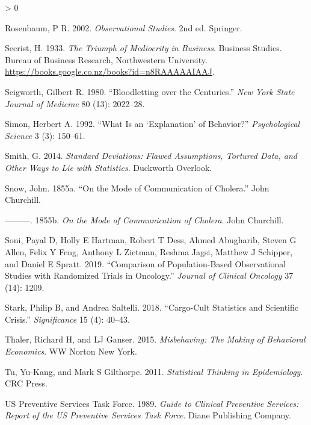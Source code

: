 \documentclass[
  10pt,
  b5paper]{book}
\newlength{\cslhangindent}
\newenvironment{CSLReferences}[2] %
 {%
  \setlength{\parindent}{0pt}
  \ifodd #1 \everypar{\setlength{\hangindent}{\cslhangindent}}\ignorespaces\fi
  \ifnum #2 > 0
  \setlength{\parskip}{#2\baselineskip}
  \fi
 }%
 {}
\begin{document}
\begin{CSLReferences}{1}{0}
\leavevmode\hypertarget{ref-RosBook}{}%
Rosenbaum, P R. 2002. \emph{Observational Studies}. 2nd ed. Springer.

\leavevmode\hypertarget{ref-secrist1933triumph}{}%
Secrist, H. 1933. \emph{The Triumph of Mediocrity in Business}. Business Studies. Bureau of Business Research, Northwestern University. \url{https://books.google.co.nz/books?id=n8RAAAAAIAAJ}.

\leavevmode\hypertarget{ref-seigworth1980bloodletting}{}%
Seigworth, Gilbert R. 1980. {``Bloodletting over the Centuries.''} \emph{New York State Journal of Medicine} 80 (13): 2022--28.

\leavevmode\hypertarget{ref-simon1992explanation}{}%
Simon, Herbert A. 1992. {``What Is an {`Explanation'} of Behavior?''} \emph{Psychological Science} 3 (3): 150--61.

\leavevmode\hypertarget{ref-smith-sd}{}%
Smith, G. 2014. \emph{Standard Deviations: Flawed Assumptions, Tortured Data, and Other Ways to Lie with Statistics}. Duckworth Overlook.

\leavevmode\hypertarget{ref-snow1849mode}{}%
Snow, John. 1855a. {``On the Mode of Communication of Cholera.''} John Churchill.

\leavevmode\hypertarget{ref-snow1855mode}{}%
---------. 1855b. \emph{On the Mode of Communication of Cholera}. John Churchill.

\leavevmode\hypertarget{ref-soni2019comparison}{}%
Soni, Payal D, Holly E Hartman, Robert T Dess, Ahmed Abugharib, Steven G Allen, Felix Y Feng, Anthony L Zietman, Reshma Jagsi, Matthew J Schipper, and Daniel E Spratt. 2019. {``Comparison of Population-Based Observational Studies with Randomized Trials in Oncology.''} \emph{Journal of Clinical Oncology} 37 (14): 1209.

\leavevmode\hypertarget{ref-stark2018cargo}{}%
Stark, Philip B, and Andrea Saltelli. 2018. {``Cargo-Cult Statistics and Scientific Crisis.''} \emph{Significance} 15 (4): 40--43.

\leavevmode\hypertarget{ref-thaler2015misbehaving}{}%
Thaler, Richard H, and LJ Ganser. 2015. \emph{Misbehaving: The Making of Behavioral Economics}. WW Norton New York.

\leavevmode\hypertarget{ref-tu2011statistical}{}%
Tu, Yu-Kang, and Mark S Gilthorpe. 2011. \emph{Statistical Thinking in Epidemiology}. CRC Press.

\leavevmode\hypertarget{ref-us1989guide}{}%
US Preventive Services Task Force. 1989. \emph{Guide to Clinical Preventive Services: Report of the US Preventive Services Task Force}. Diane Publishing Company.


\end{CSLReferences}
\end{document}
